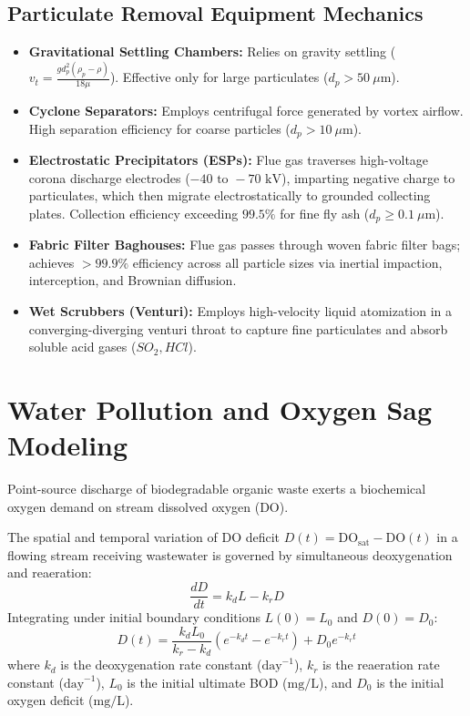\subsection{Particulate Removal Equipment Mechanics}
\begin{itemize}[leftmargin=1.5em]
    \item \textbf{Gravitational Settling Chambers:} Relies on gravity settling ($v_t = \frac{g d_p^2 (\rho_p - \rho)}{18 \mu}$). Effective only for large particulates ($d_p > 50\ \mu\text{m}$).
    \item \textbf{Cyclone Separators:} Employs centrifugal force generated by vortex airflow. High separation efficiency for coarse particles ($d_p > 10\ \mu\text{m}$).
    \item \textbf{Electrostatic Precipitators (ESPs):} Flue gas traverses high-voltage corona discharge electrodes ($-40\text{ to }-70\text{ kV}$), imparting negative charge to particulates, which then migrate electrostatically to grounded collecting plates. Collection efficiency exceeding $99.5\%$ for fine fly ash ($d_p \ge 0.1\ \mu\text{m}$).
    \item \textbf{Fabric Filter Baghouses:} Flue gas passes through woven fabric filter bags; achieves $>99.9\%$ efficiency across all particle sizes via inertial impaction, interception, and Brownian diffusion.
    \item \textbf{Wet Scrubbers (Venturi):} Employs high-velocity liquid atomization in a converging-diverging venturi throat to capture fine particulates and absorb soluble acid gases ($SO_2, HCl$).
\end{itemize}

\section{Water Pollution and Oxygen Sag Modeling}
Point-source discharge of biodegradable organic waste exerts a biochemical oxygen demand on stream dissolved oxygen (DO).

\begin{keyequation}
The spatial and temporal variation of DO deficit $D(t) = \text{DO}_{\text{sat}} - \text{DO}(t)$ in a flowing stream receiving wastewater is governed by simultaneous deoxygenation and reaeration:
\begin{equation}
\frac{dD}{dt} = k_d L - k_r D
\end{equation}
Integrating under initial boundary conditions $L(0) = L_0$ and $D(0) = D_0$:
\begin{equation}
D(t) = \frac{k_d L_0}{k_r - k_d} \left( e^{-k_d t} - e^{-k_r t} \right) + D_0 e^{-k_r t}
\end{equation}
where $k_d$ is the deoxygenation rate constant ($\text{day}^{-1}$), $k_r$ is the reaeration rate constant ($\text{day}^{-1}$), $L_0$ is the initial ultimate BOD ($\text{mg/L}$), and $D_0$ is the initial oxygen deficit ($\text{mg/L}$).
\end{keyequation}

